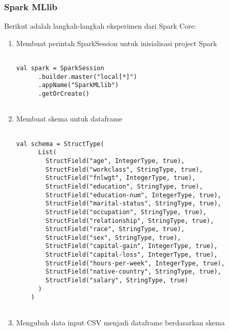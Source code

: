 \subsubsection{Spark MLlib}
\noindent Berikut adalah langkah-langkah eksperimen dari Spark Core:
\begin{enumerate}

\item Membuat perintah SparkSession untuk inisialisasi project Spark
\begin{lstlisting}[basicstyle=\ttfamily, frame=single,
	columns=fullflexible, keepspaces=true, breaklines=true, label=ls_kepatuhan_1_1_1_logo_sharif_judge, caption=Main method]
	
val spark = SparkSession
      .builder.master("local[*]")
      .appName("SparkMLlib")
      .getOrCreate()
	
\end{lstlisting}

\item Membuat skema untuk dataframe 
\begin{lstlisting}[basicstyle=\ttfamily, frame=single,
	columns=fullflexible, keepspaces=true, breaklines=true, label=ls_kepatuhan_1_1_1_logo_sharif_judge, caption=Main method]
	
val schema = StructType(
      List(
        StructField("age", IntegerType, true),
        StructField("workclass", StringType, true),
        StructField("fnlwgt", IntegerType, true),
        StructField("education", StringType, true),
        StructField("education-num", IntegerType, true),
        StructField("marital-status", StringType, true),
        StructField("occupation", StringType, true),
        StructField("relationship", StringType, true),
        StructField("race", StringType, true),
        StructField("sex", StringType, true),
        StructField("capital-gain", IntegerType, true),
        StructField("capital-loss", IntegerType, true),
        StructField("hours-per-week", IntegerType, true),
        StructField("native-country", StringType, true),
        StructField("salary", StringType, true)
      )
    )
    	
\end{lstlisting}

\item Mengubah data input CSV menjadi dataframe berdasarkan skema
\begin{lstlisting}[basicstyle=\ttfamily, frame=single,
	columns=fullflexible, keepspaces=true, breaklines=true, label=ls_kepatuhan_1_1_1_logo_sharif_judge, caption=Main method]
	

\end{lstlisting}
\end{enumerate}
